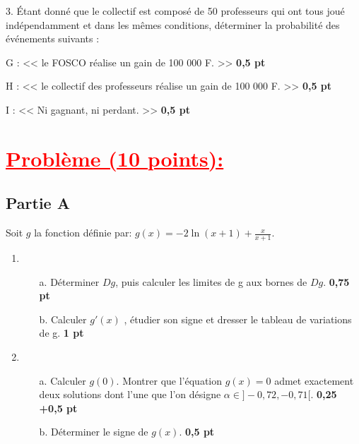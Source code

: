 \documentclass[12pt]{article}
\begin{document}
3. Étant donné que le collectif est composé de 50 professeurs qui ont tous joué indépendamment et dans les mêmes conditions, déterminer la probabilité des événements suivants :

G : << le FOSCO réalise un gain de 100 000 F. >> \textbf{0,5 pt}

H : << le collectif des professeurs réalise un gain de 100 000 F. >> \textbf{0,5 pt}

I : << Ni gagnant, ni perdant. >> \textbf{0,5 pt}
\section*{\textcolor{red}{\underline{Problème (10 points):}}}

\subsection*{\centering Partie A}

Soit $g$ la fonction définie par: $g(x)=-2\ln(x+1)+\frac{x}{x+1}.$
\begin{enumerate}
\item 
\begin{enumerate}
\item[a.] Déterminer $Dg$, puis calculer les limites de g aux bornes de $Dg$. \textbf{0,75 pt}
\item[b.] Calculer $g'(x)$ , étudier son signe et dresser le tableau de variations de g. \textbf{1 pt}
\end{enumerate}
\item 
\begin{enumerate}
\item[a.] Calculer $g(0)$. Montrer que l’équation $g(x) = 0$ admet exactement deux solutions dont l’une que l’on désigne $\alpha \in ]-0,72, -0,71[.$ \textbf{0,25 +0,5 pt}
\item[b.] Déterminer le signe de $g(x)$. \textbf{0,5 pt}
\end{enumerate}
\end{enumerate}
\end{document}
